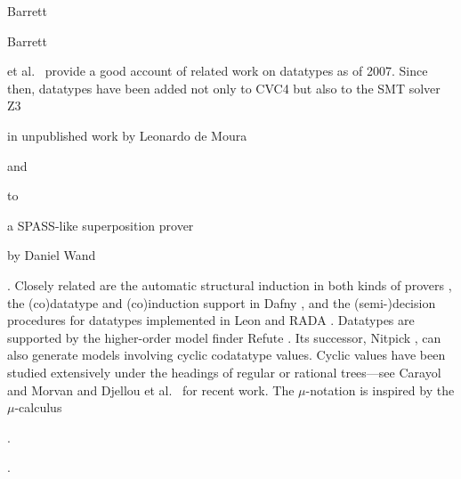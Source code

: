 
\begin{rep} Barrett\end{rep}%
\begin{conf}Barrett\end{conf}
et al.\ \cite{barrett-et-al-2007} provide a good account of
related work on datatypes as of 2007. Since then, datatypes have been added not only to CVC4
but also to the SMT solver
Z3 \cite{de-moura-bjoerner-2008} \begin{rep}in unpublished work by Leonardo de Moura \end{rep}and \begin{rep}to \end{rep}a SPASS-like %
superposition prover \begin{rep}by Daniel Wand\end{rep} \cite{wand-2014}.
Closely related are the automatic structural
induction in both kinds of provers \cite{kersani-peltier-2013,cruanes-201x,wand-weidenbach-201x,reynolds-kuncak-2015},
the (co)datatype and (co)induction support in Dafny \cite{leino-moskal-2014},
and the (semi-)decision procedures for datatypes
implemented in Leon \cite{suter-et-al-2011} and RADA \cite{pham-et-al-2013}.
%
Datatypes are supported by the higher-order model finder Refute
\cite{weber-2008}. Its successor, Nitpick \cite{blanchette-nipkow-2010}, can
also generate models involving cyclic codatatype values.
Cyclic values have been studied extensively under the headings of
regular or rational trees---see Carayol and Morvan
\cite{carayol-morvan-2006} and Djellou et al.\ \cite{djelloul-et-al-2008}
for recent work.
The $\mu$-notation is inspired by the $\mu$-calculus
\begin{conf}\cite{kozen-1983}.\end{conf}
\begin{rep}\cite[etc.]{kozen-1983,endrullis-et-al-2011}.\end{rep}



%

